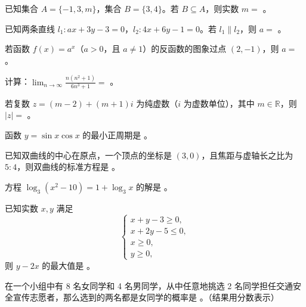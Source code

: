 \begin{question}
已知集合 $A=\{-1,3,m\}$，集合 $B=\{3,4\}$。若 $B\subseteq A$，则实数 $m=$ \gkblank{}。

\end{question}
\begin{question}
已知两条直线 $l_1:ax+3y-3=0$，$l_2:4x+6y-1=0$。若 $l_1\parallel l_2$，则 $a=$ \gkblank{}。

\end{question}
\begin{question}
若函数 $f(x)=a^x$（$a>0$，且 $a\ne1$）的反函数的图象过点 $(2,-1)$，则 $a=$ \gkblank{}。

\end{question}
\begin{question}
计算：$\displaystyle\lim_{n\to\infty}\frac{n(n^2+1)}{6n^3+1}=$ \gkblank{}。

\end{question}
\begin{question}
若复数 $z=(m-2)+(m+1)i$ 为纯虚数（$i$ 为虚数单位），其中 $m\in\mathbb R$，则 $|z|=$ \gkblank{}。

\end{question}
\begin{question}
函数 $y=\sin x\cos x$ 的最小正周期是 \gkblank{}。

\end{question}
\begin{question}
已知双曲线的中心在原点，一个顶点的坐标是 $(3,0)$，且焦距与虚轴长之比为 $5:4$，则双曲线的标准方程是 \gkblank{}。

\end{question}
\begin{question}
方程 $\log_3(x^2-10)=1+\log_3x$ 的解是 \gkblank{}。

\end{question}
\begin{question}
已知实数 $x,y$ 满足
\nopagebreak[4]
\[
\begin{cases}
x+y-3\geqslant0,\\
x+2y-5\leqslant0,\\
x\geqslant0,\\
y\geqslant0,
\end{cases}
\]
则 $y-2x$ 的最大值是 \gkblank{}。

\end{question}
\begin{question}
在一个小组中有 8 名女同学和 4 名男同学，从中任意地挑选 2 名同学担任交通安全宣传志愿者，那么选到的两名都是女同学的概率是 \gkblank{}。（结果用分数表示）

\end{question}
